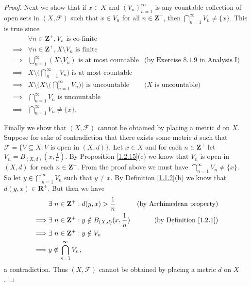 \begin{proof}
    Next we show that if \(x \in X\) and \((V_n)_{n = 1}^\infty\) is any countable collection of open sets in \((X, \mathcal{F})\) such that \(x \in V_n\) for all \(n \in \mathbf{Z}^+\), then \(\bigcap_{n = 1}^\infty V_n \neq \{x\}\).
    This is true since
    \begin{align*}
                 & \forall n \in \mathbf{Z}^+, V_n \text{ is co-finite}                                                                                         \\
        \implies & \forall n \in \mathbf{Z}^+, X \setminus V_n \text{ is finite}                                                                                \\
        \implies & \bigcup_{n = 1}^\infty (X \setminus V_n) \text{ is at most countable}                             & \text{(by Exercise 8.1.9 in Analysis I)} \\
        \implies & X \setminus \bigg(\bigcap_{n = 1}^\infty V_n\bigg) \text{ is at most countable}                                                              \\
        \implies & X \setminus \Bigg(X \setminus \bigg(\bigcap_{n = 1}^\infty V_n\bigg)\Bigg) \text{ is uncountable} & \text{(\(X\) is uncountable)}            \\
        \implies & \bigcap_{n = 1}^\infty V_n \text{ is uncountable}                                                                                            \\
        \implies & \bigcap_{n = 1}^\infty V_n \neq \{x\}.
    \end{align*}

    Finally we show that \((X, \mathcal{F})\) cannot be obtained by placing a metric \(d\) on \(X\).
    Suppose for sake of contradiction that there exists some metric \(d\) such that \(\mathcal{F} = \{V \subseteq X : V \text{ is open in } (X, d)\}\).
    Let \(x \in X\) and for each \(n \in \mathbf{Z}^+\) let \(V_n = B_{(X, d)}(x, \frac{1}{n})\).
    By Proposition \ref{1.2.15}(c) we know that \(V_n\) is open in \((X, d)\) for each \(n \in \mathbf{Z}^+\).
    From the proof above we must have \(\bigcap_{n = 1}^\infty V_n \neq \{x\}\).
    So let \(y \in \bigcap_{n = 1}^\infty V_n\) such that \(y \neq x\).
    By Definition \ref{1.1.2}(b) we know that \(d(y, x) \in \mathbf{R}^+\).
    But then we have
    \begin{align*}
                 & \exists\ n \in \mathbf{Z}^+ : d(y, x) > \frac{1}{n}               & \text{(by Archimedean property)}   \\
        \implies & \exists\ n \in \mathbf{Z}^+ : y \notin B_{(X, d)}(x, \frac{1}{n}) & \text{(by Definition \ref{1.2.1})} \\
        \implies & \exists\ n \in \mathbf{Z}^+ : y \notin V_n                                                             \\
        \implies & y \notin \bigcap_{n = 1}^\infty V_n,
    \end{align*}
    a contradiction.
    Thus \((X, \mathcal{F})\) cannot be obtained by placing a metric \(d\) on \(X\).
\end{proof}

